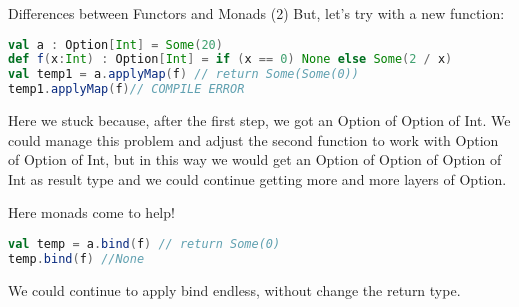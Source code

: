 \begin{frame}[fragile]{Differences between Functors and Monads (2)}
	But, let's try with a new function:
\begin{lstlisting}[language=scala]
val a : Option[Int] = Some(20)		
def f(x:Int) : Option[Int] = if (x == 0) None else Some(2 / x)
val temp1 = a.applyMap(f) // return Some(Some(0))
temp1.applyMap(f)// COMPILE ERROR
\end{lstlisting}	
	Here we stuck because, after the first step, we got an Option of Option of Int. 
	We could manage this problem and adjust the second function	to work with Option of Option of Int, 
	but in this way we would get an Option of Option of Option of Int as result type and we could continue getting more and more layers of Option.
	
	\pause
	
	Here monads come to help!
\begin{lstlisting}[language=scala]
val temp = a.bind(f) // return Some(0)
temp.bind(f) //None
\end{lstlisting}	
	We could continue to apply bind endless, without change the return type.
\end{frame}
